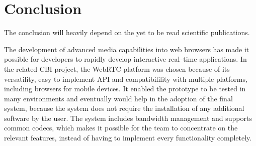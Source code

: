 \documentclass[english,12pt,a4paper,dvips]{article}
\begin{document}
\clearpage


\section{Conclusion}

The conclusion will heavily depend on the yet to be read scientific publications.

The development of advanced media capabilities into web browsers has made it possible for developers to rapidly develop interactive real--time applications. In the related CBI project, the WebRTC platform was chosen because of its versatility, easy to implement API and compatibilility with multiple platforms, including browsers for mobile devices. It enabled the prototype to be tested in many environments and eventually would help in the adoption of the final system, because the system does not require the installation of any additional software by the user.
The system includes bandwidth management and supports common codecs, which makes it possible for the team to concentrate on the relevant features, instead of having to implement every functionality completely.

\clearpage

\end{document}
